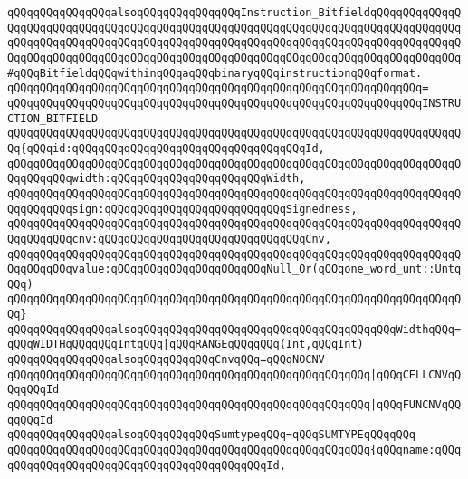 \newline
\verb|qQQqqQQqqQQqqQQqalsoqQQqqQQqqQQqqQQqInstruction_BitfieldqQQqqQQqqQQqqQQqqQQqqQQqqQQqqQQqqQQqqQQqqQQqqQQqqQQqqQQqqQQqqQQqqQQqqQQqqQQqqQQqqQQqqQQqqQQqqQQqqQQqqQQqqQQqqQQqqQQqqQQqqQQqqQQqqQQqqQQqqQQqqQQqqQQqqQQqqQQqqQQqqQQqqQQqqQQqqQQqqQQqqQQqqQQqqQQqqQQqqQQqqQQqqQQqqQQqqQQqqQQqqQQq#qQQqBitfieldqQQqwithinqQQqaqQQqbinaryqQQqinstructionqQQqformat.|\newline
\verb|qQQqqQQqqQQqqQQqqQQqqQQqqQQqqQQqqQQqqQQqqQQqqQQqqQQqqQQqqQQqqQQq=|\newline
\verb|qQQqqQQqqQQqqQQqqQQqqQQqqQQqqQQqqQQqqQQqqQQqqQQqqQQqqQQqqQQqqQQqINSTRUCTION_BITFIELD|\newline
\verb|qQQqqQQqqQQqqQQqqQQqqQQqqQQqqQQqqQQqqQQqqQQqqQQqqQQqqQQqqQQqqQQqqQQqqQQq{qQQqid:qQQqqQQqqQQqqQQqqQQqqQQqqQQqqQQqqQQqId,|\newline
\verb|qQQqqQQqqQQqqQQqqQQqqQQqqQQqqQQqqQQqqQQqqQQqqQQqqQQqqQQqqQQqqQQqqQQqqQQqqQQqqQQqwidth:qQQqqQQqqQQqqQQqqQQqqQQqWidth,|\newline
\verb|qQQqqQQqqQQqqQQqqQQqqQQqqQQqqQQqqQQqqQQqqQQqqQQqqQQqqQQqqQQqqQQqqQQqqQQqqQQqqQQqsign:qQQqqQQqqQQqqQQqqQQqqQQqqQQqSignedness,|\newline
\verb|qQQqqQQqqQQqqQQqqQQqqQQqqQQqqQQqqQQqqQQqqQQqqQQqqQQqqQQqqQQqqQQqqQQqqQQqqQQqqQQqcnv:qQQqqQQqqQQqqQQqqQQqqQQqqQQqqQQqCnv,|\newline
\verb|qQQqqQQqqQQqqQQqqQQqqQQqqQQqqQQqqQQqqQQqqQQqqQQqqQQqqQQqqQQqqQQqqQQqqQQqqQQqqQQqvalue:qQQqqQQqqQQqqQQqqQQqqQQqNull_Or(qQQqone_word_unt::UntqQQq)|\newline
\verb|qQQqqQQqqQQqqQQqqQQqqQQqqQQqqQQqqQQqqQQqqQQqqQQqqQQqqQQqqQQqqQQqqQQqqQQq}|\newline
\newline
\verb|qQQqqQQqqQQqqQQqalsoqQQqqQQqqQQqqQQqqQQqqQQqqQQqqQQqqQQqqQQqWidthqQQq=qQQqWIDTHqQQqqQQqIntqQQq|\verb#|qQQqRANGEqQQqqQQq(Int,qQQqInt)#\newline
\newline
\verb|qQQqqQQqqQQqqQQqalsoqQQqqQQqqQQqCnvqQQq=qQQqNOCNV|\newline
\verb|qQQqqQQqqQQqqQQqqQQqqQQqqQQqqQQqqQQqqQQqqQQqqQQqqQQqqQQq|\verb#|qQQqCELLCNVqQQqqQQqId#\newline
\verb|qQQqqQQqqQQqqQQqqQQqqQQqqQQqqQQqqQQqqQQqqQQqqQQqqQQqqQQq|\verb#|qQQqFUNCNVqQQqqQQqId#\newline
\newline
\verb|qQQqqQQqqQQqqQQqalsoqQQqqQQqqQQqSumtypeqQQq=qQQqSUMTYPEqQQqqQQq|\newline
\verb|qQQqqQQqqQQqqQQqqQQqqQQqqQQqqQQqqQQqqQQqqQQqqQQqqQQqqQQq{qQQqname:qQQqqQQqqQQqqQQqqQQqqQQqqQQqqQQqqQQqqQQqqQQqId,|\newline
